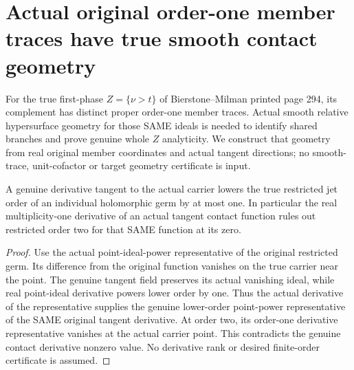\section{Actual original order-one member traces have true smooth contact geometry}

For the true first-phase $Z=\{\nu>t\}$ of Bierstone--Milman printed page 294,
its complement has distinct proper order-one member traces. Actual smooth
relative hypersurface geometry for those SAME ideals is needed to identify
shared branches and prove genuine whole $Z$ analyticity. We construct that
geometry from real original member coordinates and actual tangent directions;
no smooth-trace, unit-cofactor or target geometry certificate is input.

\begin{lemma}
\label{hir:sharp-actual-individual-restricted-jet-tangent-derivative-drop}
\leanok
A genuine derivative tangent to the actual carrier lowers the true restricted
jet order of an individual holomorphic germ by at most one. In particular the
real multiplicity-one derivative of an actual tangent contact function rules
out restricted order two for that SAME function at its zero.
\end{lemma}
\begin{proof}
Use the actual point-ideal-power representative of the original restricted
germ. Its difference from the original function vanishes on the true carrier
near the point. The genuine tangent field preserves its actual vanishing ideal,
while real point-ideal derivative powers lower order by one. Thus the actual
derivative of the representative supplies the genuine lower-order point-power
representative of the SAME original tangent derivative. At order two, its
order-one derivative representative vanishes at the actual carrier point.
This contradicts the genuine contact derivative nonzero value. No derivative
rank or desired finite-order certificate is assumed.
\end{proof}

